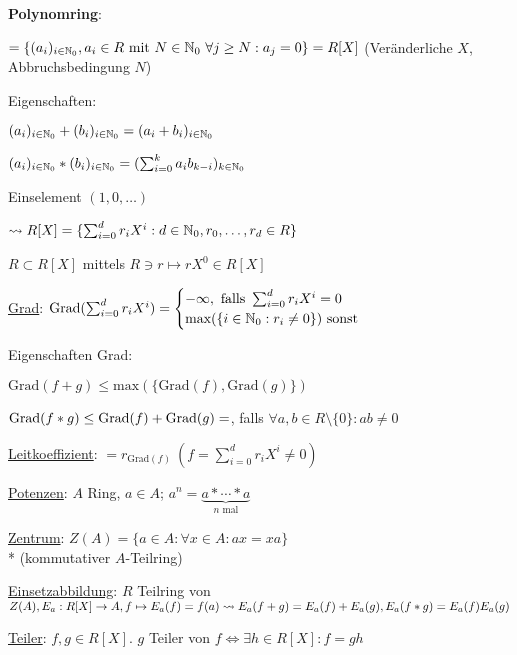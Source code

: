   \textbf{Polynomring}:
  \begin{items}
    \item $=\{ (a_i)_{i \in \mathbb{N}_0}, a_i \in R \text{ mit } N \in \mathbb{N}_0 \ \forall j \geq N: a_j=0 \}=R[X]$ (Veränderliche $X$, Abbruchsbedingung $N$)
    \item Eigenschaften:
    \begin{enumeration}
      \item $(a_i)_{i \in \mathbb{N}_0}+(b_i)_{i \in \mathbb{N}_0} = (a_i+b_i)_{i \in \mathbb{N}_0}$
      \item $(a_i)_{i \in \mathbb{N}_0}*(b_i)_{i \in \mathbb{N}_0} = (\sum_{i=0}^k a_ib_{k-i})_{k \in \mathbb{N}_0}$
      \item Einselement $(1,0,\dots)$
    \end{enumeration}
    \item $\leadsto R[X]=\{ \sum_{i=0}^d r_iX^i : d \in \mathbb{N}_0, r_0,\dots,r_d \in R \}$
    \item $R \subset R[X]$ mittels $R \ni r \mapsto rX^0 \in R[X]$
    \item \underline{Grad}: $\text{Grad}(\sum_{i=0}^d r_iX^i)=\begin{cases} -\infty, \text{ falls } \sum_{i=0}^d r_iX^i=0 \\ \text{max}(\{ i \in \mathbb{N}_0: r_i \neq 0 \} ) \text{ sonst} \end{cases}$
    \item Eigenschaften Grad:
    \begin{enumeration}
      \item $\text{Grad}(f+g) \leq \text{max}(\{ \text{Grad}(f), \text{Grad}(g) \})$
      \item $\text{Grad}(f*g) \leq \text{Grad}(f)+\text{Grad}(g) \\* =$, falls $\forall a,b \in R \setminus \{ 0 \}: ab \neq 0$
    \end{enumeration}
    \item \underline{Leitkoeffizient}: $=r_{\text{Grad}(f)} \ (f = \sum_{i=0}^d r_iX^i \neq 0)$
    \item \underline{Potenzen}: $A$ Ring, $a \in A$; $a^n = \underbrace{a*\cdots *a}_{n \text{ mal}}$
    \item \underline{Zentrum}: $Z(A)=\{ a \in A : \forall x \in A : ax = xa \}$ \\* (kommutativer $A$-Teilring)
    \item \underline{Einsetzabbildung}: $R$ Teilring von $Z(A), \\* E_a:R[X] \rightarrow A, f \mapsto E_a(f)=f(a) \\* \leadsto E_a(f+g)=E_a(f)+E_a(g), E_a(f*g)=E_a(f)E_a(g)$
    \item \underline{Teiler}: $f,g \in R[X]$. $g$ Teiler von $f \Leftrightarrow  \exists h \in R[X]: f=gh$
  \end{items}